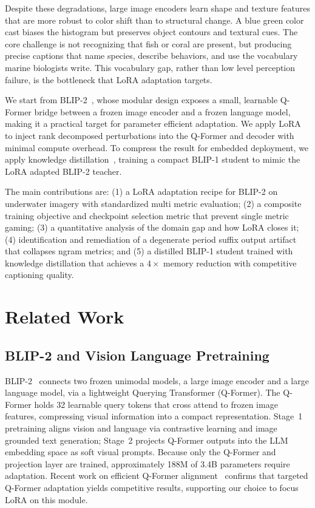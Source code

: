 \documentclass[journal]{IEEEtran}
\begin{document}
Despite these degradations, large image encoders learn shape and texture features that are more robust to color shift than to structural change. A blue green color cast biases the histogram but preserves object contours and textural cues. The core challenge is not recognizing that fish or coral are present, but producing precise captions that name species, describe behaviors, and use the vocabulary marine biologists write. This vocabulary gap, rather than low level perception failure, is the bottleneck that LoRA adaptation targets.

We start from BLIP-2~\cite{ref3}, whose modular design exposes a small, learnable Q-Former bridge between a frozen image encoder and a frozen language model, making it a practical target for parameter efficient adaptation. We apply LoRA~\cite{ref1} to inject rank decomposed perturbations into the Q-Former and decoder with minimal compute overhead. To compress the result for embedded deployment, we apply knowledge distillation~\cite{ref2}, training a compact BLIP-1 student to mimic the LoRA adapted BLIP-2 teacher.

The main contributions are: (1) a LoRA adaptation recipe for BLIP-2 on underwater imagery with standardized multi metric evaluation; (2) a composite training objective and checkpoint selection metric that prevent single metric gaming; (3) a quantitative analysis of the domain gap and how LoRA closes it; (4) identification and remediation of a degenerate period suffix output artifact that collapses ngram metrics; and (5) a distilled BLIP-1 student trained with knowledge distillation that achieves a $4\times$ memory reduction with competitive captioning quality.

\section{Related Work}

\subsection{BLIP-2 and Vision Language Pretraining}
BLIP-2~\cite{ref3} connects two frozen unimodal models, a large image encoder and a large language model, via a lightweight Querying Transformer (Q-Former). The Q-Former holds 32 learnable query tokens that cross attend to frozen image features, compressing visual information into a compact representation. Stage~1 pretraining aligns vision and language via contrastive learning and image grounded text generation; Stage~2 projects Q-Former outputs into the LLM embedding space as soft visual prompts. Because only the Q-Former and projection layer are trained, approximately 188M of 3.4B parameters require adaptation. Recent work on efficient Q-Former alignment~\cite{ref6} confirms that targeted Q-Former adaptation yields competitive results, supporting our choice to focus LoRA on this module.
\end{document}
